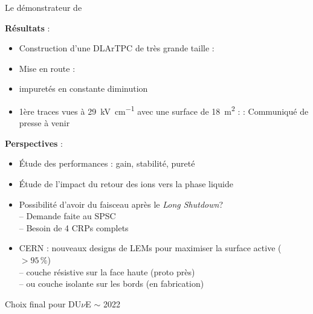     \begin{frame}{Le démonstrateur de \SSS{}}
        \begin{scriptsize}
            \textbf{Résultats} :
            \begin{itemize}
                \item Construction d'une DLArTPC de très grande taille : \textcolor{green}{\checkmark}
                \item Mise en route : \textcolor{green}{\checkmark}
                \item impuretés en constante diminution
                \item 1ère traces
                    \iftracks vues à \SI{29}{\kilo\volt\per\centi\meter} avec une surface de \SI{18}{\meter\squared}  : \textcolor{green}{\checkmark} \else : Communiqué de presse à venir \fi
            \end{itemize}\vspace{0.2cm}\pause
            \textbf{Perspectives} :
            \begin{itemize}
                \item Étude des performances : gain, stabilité, pureté
                \item Étude de l'impact du retour des ions vers la phase liquide
                \item Possibilité d'avoir du faisceau après le \textit{Long Shutdown}? \\
                -- Demande faite au SPSC\\
                -- Besoin de 4 CRPs complets
                \item CERN : nouveaux designs de LEMs pour maximiser la surface active ($>95\,\%$) \\
                    -- couche résistive sur la face haute (proto près)\\
                    -- ou couche isolante sur les bords (en fabrication)
            \end{itemize}
            Choix final pour DU$\nu$E $\sim$ 2022
        \end{scriptsize}
    \end{frame}

